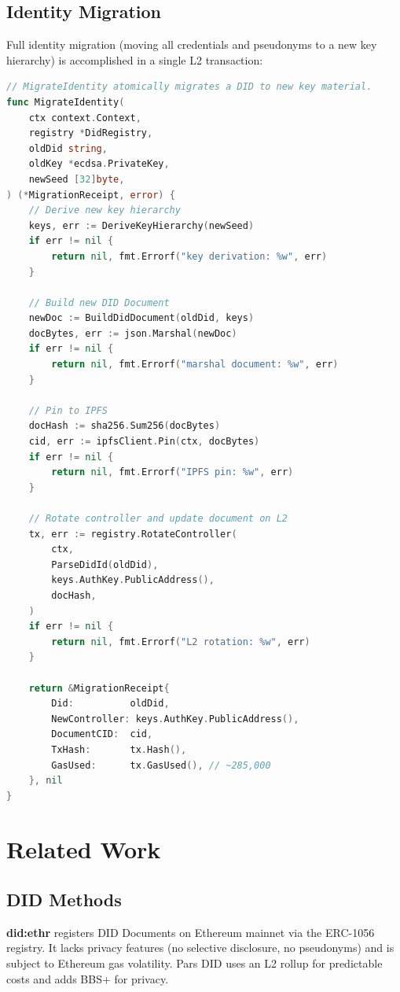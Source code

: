 \documentclass[11pt,a4paper]{article}
\begin{document}
\subsection{Identity Migration}

Full identity migration (moving all credentials and pseudonyms to a new key hierarchy)
is accomplished in a single L2 transaction:

\begin{lstlisting}[language=Go,caption={Identity migration}]
// MigrateIdentity atomically migrates a DID to new key material.
func MigrateIdentity(
    ctx context.Context,
    registry *DidRegistry,
    oldDid string,
    oldKey *ecdsa.PrivateKey,
    newSeed [32]byte,
) (*MigrationReceipt, error) {
    // Derive new key hierarchy
    keys, err := DeriveKeyHierarchy(newSeed)
    if err != nil {
        return nil, fmt.Errorf("key derivation: %w", err)
    }

    // Build new DID Document
    newDoc := BuildDidDocument(oldDid, keys)
    docBytes, err := json.Marshal(newDoc)
    if err != nil {
        return nil, fmt.Errorf("marshal document: %w", err)
    }

    // Pin to IPFS
    docHash := sha256.Sum256(docBytes)
    cid, err := ipfsClient.Pin(ctx, docBytes)
    if err != nil {
        return nil, fmt.Errorf("IPFS pin: %w", err)
    }

    // Rotate controller and update document on L2
    tx, err := registry.RotateController(
        ctx,
        ParseDidId(oldDid),
        keys.AuthKey.PublicAddress(),
        docHash,
    )
    if err != nil {
        return nil, fmt.Errorf("L2 rotation: %w", err)
    }

    return &MigrationReceipt{
        Did:          oldDid,
        NewController: keys.AuthKey.PublicAddress(),
        DocumentCID:  cid,
        TxHash:       tx.Hash(),
        GasUsed:      tx.GasUsed(), // ~285,000
    }, nil
}
\end{lstlisting}

\section{Related Work}
\label{sec:related}

\subsection{DID Methods}

\textbf{did:ethr} \cite{did-ethr} registers DID Documents on Ethereum mainnet via
the ERC-1056 registry. It lacks privacy features (no selective disclosure, no
pseudonyms) and is subject to Ethereum gas volatility. Pars DID uses an L2 rollup
for predictable costs and adds BBS+ for privacy.
\end{document}
